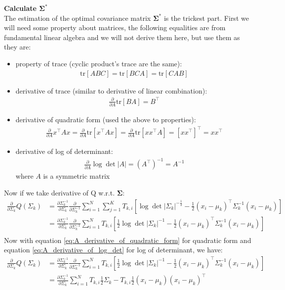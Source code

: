 \documentclass{article} [10pt] %
\newcommand{\bs}{\boldsymbol}
\newcommand{\tr}{\text{tr}}
\begin{document}
\textbf{Calculate $\bs\Sigma^*$}\\
The estimation of the optimal covariance matrix $\bs\Sigma^*$ is the trickest part. First we will need some property about matrices, the following equalities are from fundamental linear algebra and we will not derive them here, but use them as they are:
\begin{itemize}
	\item property of trace (cyclic product's trace are the same):
	\begin{align}
		\tr[ABC]  = \tr[BCA] = \tr[CAB]
	\end{align}	
	\item derivative of trace (similar to derivative of linear combination):
	\begin{align}
		\frac{\partial}{\partial A}  \tr[BA]  = B^\top
	\end{align}
	\item derivative of quadratic form (used the above to properties):
	\begin{align}\label{eq:A_derivative_of_quadratic_form}
		\frac{\partial}{\partial A} x^\top A x = \frac{\partial}{\partial A} \tr[x^\top A x]=\frac{\partial}{\partial A} \tr[xx^\top A ] = [xx^\top]^\top=xx^\top
	\end{align}
	\item derivative of log of determinant:
	\begin{align} \label{eq:A_derivative_of_log_det}
		\frac{\partial}{\partial A}\log\det|A| = (A^\top)^{-1} = A^{-1}
	\end{align}
	where $A$ is a symmetric matrix
\end{itemize}
Now if we take derivative of Q w.r.t. $\bs\Sigma$:
\begin{align}
\frac{\partial}{\partial\Sigma_k}Q(\Sigma_k)&=\frac{\partial\Sigma_k^{-1}}{\partial\Sigma_k}\frac{\partial}{\partial\Sigma_k^{-1}}\sum_{i=1}^N \sum_{j=1}^K T_{k, i}[ \log\det |\Sigma_k|^{-\frac{1}{2}}-\frac{1}{2}(x_i-\mu_k)^\top\Sigma_k^{-1}(x_i-\mu_k)]\\
&=\frac{\partial\Sigma_k^{-1}}{\partial\Sigma_k} \frac{\partial}{\partial\Sigma_k^{-1}}\sum_{i=1}^N T_{k, i}[ \frac{1}{2}\log\det |\Sigma_k|^{-1}-\frac{1}{2}(x_i-\mu_k)^\top\Sigma_k^{-1}(x_i-\mu_k)]\\
\end{align}
Now with equation \eqref{eq:A_derivative_of_quadratic_form} for quadratic form and equation \eqref{eq:A_derivative_of_log_det} for log of determinant, we have:
\begin{align}
\frac{\partial}{\partial\Sigma_k}Q(\Sigma_k)&=\frac{\partial\Sigma_k^{-1}}{\partial\Sigma_k} \frac{\partial}{\partial\Sigma_k^{-1}}\sum_{i=1}^N T_{k, i}[ \frac{1}{2}\log\det |\Sigma_k|^{-1}-\frac{1}{2}(x_i-\mu_k)^\top\Sigma_k^{-1}(x_i-\mu_k)]\\
&=\frac{\partial\Sigma_k^{-1}}{\partial\Sigma_k} \sum_{i=1}^N T_{k, i}\frac{1}{2}\Sigma_k -  T_{k, i}\frac{1}{2}(x_i-\mu_k)(x_i-\mu_k)^\top
\end{align}
\end{document}

